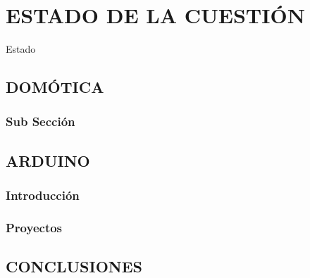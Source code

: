 \chapter{ESTADO DE LA CUESTIÓN}

Estado

\section{DOMÓTICA}
\subsection{Sub Sección}
\section{ARDUINO}
\subsection{Introducción}
\subsection{Proyectos}
\section{CONCLUSIONES}